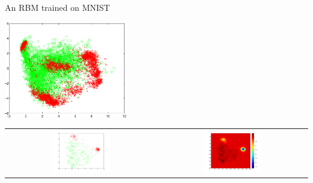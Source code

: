 \begin{frame}{An RBM trained on MNIST}
  \begin{center}
  \includegraphics[width=0.4\textwidth]{figures/rbm_pca}
  \end{center}
  \pause
  \begin{center}
  \begin{tabular}{cc}
    \includegraphics[width=0.4\textwidth]{figures/rbm_0_pca} & 
    \pause
    \includegraphics[width=0.4\textwidth]{figures/rbm_0_witness}
  \end{tabular}
  \end{center}
\end{frame}

